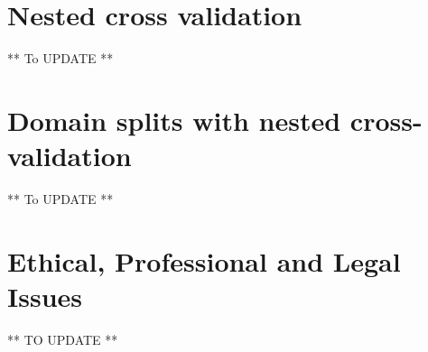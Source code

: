 \section{Nested cross validation}
** To UPDATE **

\section{Domain splits with nested cross-validation}
** To UPDATE **

\section{Ethical, Professional and Legal Issues}
** TO UPDATE **
